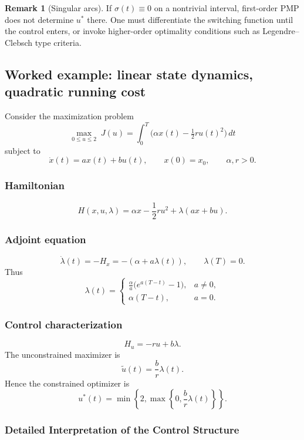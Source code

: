 \documentclass[11pt]{article}
\theoremstyle{definition}
\newtheorem{remark}{Remark}
\begin{document}
\begin{remark}[Singular arcs]
If $\sigma(t)\equiv 0$ on a nontrivial interval, first-order PMP does not determine $u^*$ there. One must differentiate the switching function until the control enters, or invoke higher-order optimality conditions such as Legendre--Clebsch type criteria.
\end{remark}

\subsection{Worked example: linear state dynamics, quadratic running cost}

Consider the maximization problem
\begin{equation}
\label{eq:ex-problem}
\max_{0\le u\le 2}\;
J(u)
=
\int_0^T \big(\alpha x(t)-\tfrac12 r u(t)^2\big)\,dt
\end{equation}
subject to
\[
\dot x(t)=a x(t)+b u(t),\qquad x(0)=x_0,
\qquad \alpha,r>0.
\]

\subsubsection*{Hamiltonian}
\[
H(x,u,\lambda)=\alpha x - \frac12 r u^2 + \lambda(ax+bu).
\]

\subsubsection*{Adjoint equation}
\[
\dot\lambda(t)=-H_x=-(\alpha+a\lambda(t)),
\qquad
\lambda(T)=0.
\]
Thus
\[
\lambda(t)=
\begin{cases}
\displaystyle \frac{\alpha}{a}\Big(e^{a(T-t)}-1\Big), & a\neq 0,\\[0.75em]
\alpha(T-t), & a=0.
\end{cases}
\]

\subsubsection*{Control characterization}
\[
H_u = -r u + b\lambda.
\]
The unconstrained maximizer is
\[
\tilde u(t)=\frac{b}{r}\lambda(t).
\]
Hence the constrained optimizer is
\[
u^*(t)=\min\left\{2,\max\left\{0,\frac{b}{r}\lambda(t)\right\}\right\}.
\]

\subsubsection*{Detailed Interpretation of the Control Structure}
\end{document}
